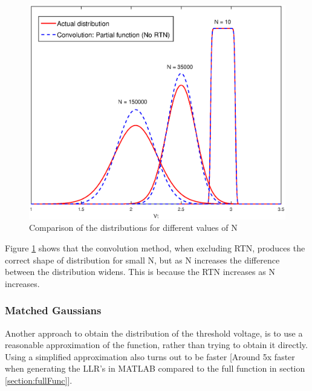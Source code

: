 \documentclass[11pt]{article}
\numberwithin{equation}{subsection}
\begin{document}
\begin{figure}[h]
\centering
\includegraphics[scale=0.6]{retention_convolution}
\caption{Comparison of the distributions for different values of N}
\label{fig:retentionVsFull}
\end{figure}
Figure \ref{fig:retentionVsFull} shows that the convolution method, when excluding RTN, produces the correct shape of distribution for small N, but as N increases the difference between the distribution widens. This is because the RTN increases as N increases.

\subsubsection{Matched Gaussians}
Another approach to obtain the distribution of the threshold voltage, is to use a reasonable approximation of the function, rather than trying to obtain it directly. Using a simplified approximation also turns out to be faster [Around 5x faster when generating the LLR's in MATLAB compared to the full function in section \ref{section:fullFunc}].
\end{document}
